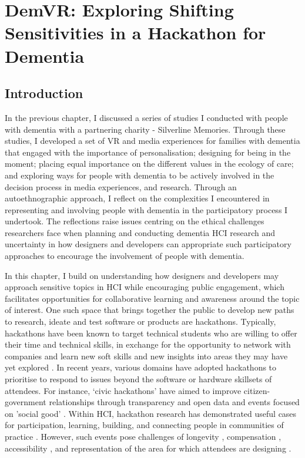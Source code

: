\chapter{DemVR: Exploring Shifting Sensitivities in a Hackathon for Dementia}
\label{DemVR}

\section{Introduction}
\label{sec:DemVRIntroduction}
In the previous chapter, I discussed a series of studies I conducted with people with dementia with a partnering charity - Silverline Memories. Through these studies, I developed a set of VR and media experiences for families with dementia that engaged with the importance of personalisation; designing for being in the moment; placing equal importance on the different values in the ecology of care; and exploring ways for people with dementia to be actively involved in the decision process in media experiences, and research. Through an autoethnographic approach, I reflect on the complexities I encountered in representing and involving people with dementia in the participatory process I undertook. The reflections raise issues centring on the ethical challenges researchers face when planning and conducting dementia HCI research and uncertainty in how designers and developers can appropriate such participatory approaches to encourage the involvement of people with dementia.

In this chapter, I build on understanding how designers and developers may approach sensitive topics in HCI while encouraging public engagement, which facilitates opportunities for collaborative learning and awareness around the topic of interest. One such space that brings together the public to develop new paths to research, ideate and test software or products are hackathons. Typically, hackathons have been known to target technical students who are willing to offer their time and technical skills, in exchange for the opportunity to network with companies and learn new soft skills and new insights into areas they may have yet explored \citep{olesen_what_2021}. In recent years, various domains have adopted hackathons to prioritise to respond to issues beyond the software or hardware skillsets of attendees. For instance, ‘civic hackathons’ \citep{johnson_civic_2014} have aimed to improve citizen-government relationships through transparency and open data and events focused on 'social good' \citep{ferrario_software_2014}. Within HCI, hackathon research has demonstrated useful cases for participation, learning, building, and connecting people in communities of practice \citep{falk_olesen_10_2020, birbeck_self_2017, hou_hacking_2017, johnson_civic_2014} . However, such events pose challenges of longevity \citep{birbeck_self_2017}, compensation \citep{endrissat_hackathons_2018}, accessibility \citep{hope_hackathons_2019}, and representation of the area for which attendees are designing \citep{toombs_hackerspace_2017}. 

